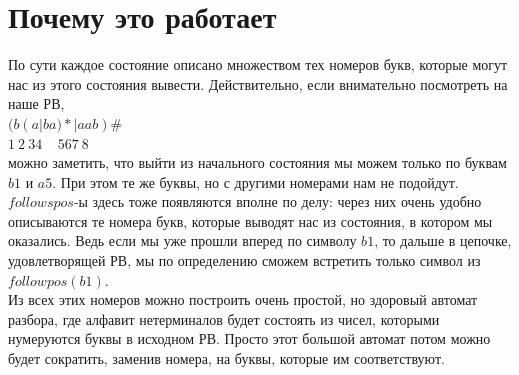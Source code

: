\documentclass[14pt]{extreport}
\begin{document}
	\section*{Почему это работает}
	По сути каждое состояние описано множеством тех номеров букв, которые могут нас из
	этого состояния вывести. Действительно, если внимательно посмотреть на наше РВ,\\
	$(b(a|ba)*|aab)\#$\\
	\hspace*{5pt}$1\ 2\ 34\ \ \ \ \ 567\ 8$\\
	можно заметить, что выйти из начального состояния мы можем только по буквам $b1$ и $a5$.
	При этом те же буквы, но с другими номерами нам не подойдут. $followspos$-ы здесь тоже
	появляются вполне по делу: через них очень удобно описываются те номера букв, которые выводят
	нас из состояния, в котором мы оказались. Ведь если мы уже прошли вперед по символу $b1$, то
	дальше в цепочке, удовлетворящей РВ, мы по определению сможем встретить только символ из
	$followpos(b1)$.\\
	Из всех этих номеров можно построить очень простой, но здоровый автомат разбора, где алфавит
	нетерминалов будет состоять из чисел, которыми нумеруются буквы в исходном РВ. Просто этот
	большой автомат потом можно будет сократить, заменив номера, на буквы, которые им
	соответствуют.
	
	
	
	
\end{document}
